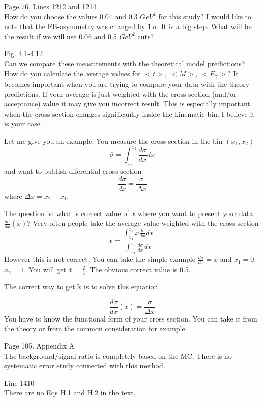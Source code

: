 \documentclass[11pt]{article}
\begin{document}
Page 76, Lines 1212 and 1214\\
How do you choose the values 0.04 and 0.3 $GeV^2$ for this study?
I would like to note that the FB-asymmetry was changed by $1~\sigma$. 
It is a big step. What will be the result if we will use 0.06 and 0.5 $GeV^2$ cuts?

Fig. 4.1-4.12\\
Can we compare these measurements with the theoretical model predictions?\\
How do you calculate the average values for $<t>,~<M>,~ <E_\gamma>$?
It becomes important when you are trying to compare your data with the theory predictions.
If your average  is just weighted with the cross section (and/or acceptance) value it may give you incorrect result.
This is especially important when the cross section changes significantly inside the kinematic bin. I believe it is your case. 

Let me give you an example. You measure the cross section in the bin $(x_1,x_2)$
$$\bar \sigma=\int_{x_1}^{x_2}\frac{d\sigma}{dx}dx$$
and want to publish diferential cross section 
$$\frac{d\sigma}{dx}=\frac{\bar \sigma}{\Delta x}$$
where $\Delta x=x_2-x_1$.

 The question is: what is correct
value of $\tilde x$ where you want to present your data $\frac{d\sigma}{dx}(\tilde x)$? Very often people 
take the average value weighted with the cross section
$$\bar x=\frac{\int_{x_1}^{x_2}x\frac{d\sigma}{dx}dx}{ \int_{x_1}^{x_2}\frac{d\sigma}{dx}dx}.$$
However this is not correct. You can take the simple example $\frac{d\sigma}{dx}=x$ and $x_1=0$, $x_2=1$.
You will get $\bar x=\frac{2}{3}$. The obvious correct value is 0.5. 

The correct way to get $\tilde x$ is to solve this equation

$$\frac{d\sigma}{dx}(\tilde x)=\frac{\bar \sigma}{\Delta x}$$
You have to know the functional form of your cross section.
You can take it from the theory or from the common consideration for example.

Page 105. Appendix A\\
The background/signal ratio is completely based on the MC. There is no systematic error study connected with this method.

Line 1410\\
There are no Eqs H.1 and H.2 in the text.
\end{document}
